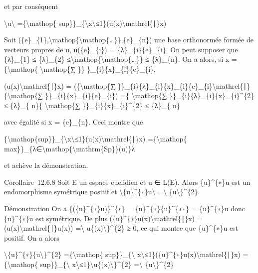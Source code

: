 \documentclass[]{article}
\begin{document}
et par conséquent

\textbackslash{}\textbar{}u\textbackslash{}\textbar{}
=\{\textbackslash{}mathop\{
sup\}\}\_\{\textbackslash{}\textbar{}x\textbackslash{}\textbar{}≤1\}(u(x)\textbackslash{}mathrel\{∣\}x)

Soit
(\{e\}\_\{1\},\textbackslash{}mathop\{\textbackslash{}mathop\{\ldots{}\}\},\{e\}\_\{n\})
une base orthonormée formée de vecteurs propres de u, u(\{e\}\_\{i\}) =
\{λ\}\_\{i\}\{e\}\_\{i\}. On peut supposer que \{λ\}\_\{1\} ≤
\{λ\}\_\{2\}
≤\textbackslash{}mathop\{\textbackslash{}mathop\{\ldots{}\}\} ≤
\{λ\}\_\{n\}. On a alors, si x =\{\textbackslash{}mathop\{
\textbackslash{}mathop\{∑ \}\} \}\_\{i\}\{x\}\_\{i\}\{e\}\_\{i\},

(u(x)\textbackslash{}mathrel\{∣\}x) = (\{\textbackslash{}mathop\{∑
\}\}\_\{i\}\{λ\}\_\{i\}\{x\}\_\{i\}\{e\}\_\{i\}\textbackslash{}mathrel\{∣\}\{\textbackslash{}mathop\{∑
\}\}\_\{i\}\{x\}\_\{i\}\{e\}\_\{i\}) =\{ \textbackslash{}mathop\{∑
\}\}\_\{i\}\{λ\}\_\{i\}\{x\}\_\{i\}\^{}\{2\} ≤ \{λ\}\_\{ n\}\{
\textbackslash{}mathop\{∑ \}\}\_\{i\}\{x\}\_\{i\}\^{}\{2\} ≤ \{λ\}\_\{
n\}

avec égalité si x = \{e\}\_\{n\}. Ceci montre que

\{\textbackslash{}mathop\{sup\}\}\_\{\textbackslash{}\textbar{}x\textbackslash{}\textbar{}≤1\}(u(x)\textbackslash{}mathrel\{∣\}x)
=\{\textbackslash{}mathop\{
max\}\}\_\{λ∈\textbackslash{}mathop\{\textbackslash{}mathrm\{Sp\}\}(u)\}λ

et achève la démonstration.

Corollaire~12.6.8 Soit E un espace euclidien et u ∈ L(E). Alors
\{u\}\^{}\{∗\}u est un endomorphisme symétrique positif et
\textbackslash{}\textbar{}\{u\}\^{}\{∗\}u\textbackslash{}\textbar{}
=\textbackslash{}\textbar{} \{u\textbackslash{}\textbar{}\}\^{}\{2\}.

Démonstration On a \{(\{u\}\^{}\{∗\}u)\}\^{}\{∗\} =
\{u\}\^{}\{∗\}\{u\}\^{}\{∗∗\} = \{u\}\^{}\{∗\}u donc \{u\}\^{}\{∗\}u est
symétrique. De plus (\{u\}\^{}\{∗\}u(x)\textbackslash{}mathrel\{∣\}x) =
(u(x)\textbackslash{}mathrel\{∣\}u(x)) =\textbackslash{}\textbar{}
u\{(x)\textbackslash{}\textbar{}\}\^{}\{2\} ≥ 0, ce qui montre que
\{u\}\^{}\{∗\}u est positif. On a alors

\textbackslash{}\textbar{}\{u\}\^{}\{∗\}\{u\textbackslash{}\textbar{}\}\^{}\{2\}
=\{\textbackslash{}mathop\{ sup\}\}\_\{\textbackslash{}\textbar{}
x\textbackslash{}\textbar{}≤1\}(\{u\}\^{}\{∗\}u(x)\textbackslash{}mathrel\{∣\}x)
=\{\textbackslash{}mathop\{ sup\}\}\_\{\textbackslash{}\textbar{}
x\textbackslash{}\textbar{}≤1\}\textbackslash{}\textbar{}u\{(x)\textbackslash{}\textbar{}\}\^{}\{2\}
=\textbackslash{}\textbar{} \{u\textbackslash{}\textbar{}\}\^{}\{2\}
\end{document}
